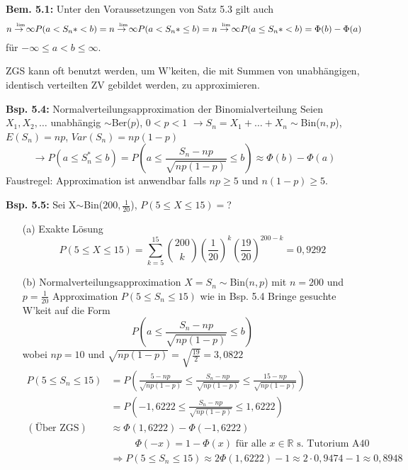 \documentclass[a4paper,11pt]{article}
\begin{document}
\vspace{6pt}
\noindent\textbf{Bem. 5.1:}
Unter den Voraussetzungen von Satz 5.3 gilt auch 
\[\overset{\mathclap{\scriptscriptstyle \text{lim}}}{n\rightarrow\infty} P(a<S_n*<b)=\overset{\mathclap{\scriptscriptstyle \text{lim}}}{n\rightarrow\infty}P(a<S_n*\leq b) = \overset{\mathclap{\scriptscriptstyle \text{lim}}}{n\rightarrow\infty}P(a\leq S_n*<b) = \Phi(b) - \Phi(a)\]
für $-\infty\leq a<b\leq\infty$.

\vspace{6pt}
\noindent ZGS kann oft benutzt werden, um W'keiten, die mit Summen von unabhängigen, identisch verteilten ZV gebildet werden, zu approximieren. 

\vspace{6pt}
\noindent\textbf{Bsp. 5.4:} Normalverteilungsapproximation der Binomialverteilung
Seien $X_1,X_2,\dots$ unabhängig $\sim$Ber($p$), $0<p<1$
$\rightarrow S_n = X_1 + \dots + X_n \sim$Bin($n,p$), $E(S_n)=np$, $Var(S_n)=np(1-p)$
\[\rightarrow P(a\leq S_n^*\leq b)  =P(a\leq \frac{S_n-np}{\sqrt{np(1-p)}}\leq b) \approx \Phi(b) - \Phi(a)\]
Faustregel: Approximation ist anwendbar falls $np\geq5$ und $n(1-p)\geq5$. 

\vspace{6pt}
\noindent\textbf{Bsp. 5.5:}
Sei X$\sim$Bin($200,\frac{1}{20}$), $P(5\leq X\leq15)=$?
\begin{itemize}
\item[(a)] Exakte Lösung 
\[P(5\leq X\leq15)=\sum_{k=5}^{15}\binom{200}{k}(\frac{1}{20})^k(\frac{19}{20})^{200-k} = 0,9292\]
\item[(b)] Normalverteilungsapproximation
$X=S_n\sim$Bin($n,p$) mit $n=200$ und $p=\frac{1}{20}$
\newline Approximation $P(5\leq S_n\leq15)$ wie in Bsp. 5.4
\newline Bringe gesuchte W'keit auf die Form 
\[P(a\leq \frac{S_n-np}{\sqrt{np(1-p)}}\leq b) \]
wobei $np=10$ und $\sqrt{np(1-p)}=\sqrt{\frac{19}{2}}=3,0822$
\begin{align*}
P(5\leq S_n\leq15) &= P(\frac{5-np}{\sqrt{np(1-p)}}\leq\frac{S_n-np}{\sqrt{np(1-p)}}\leq\frac{15-np}{\sqrt{np(1-p)}})\\
&= P(-1,6222\leq\frac{S_n-np}{\sqrt{np(1-p)}}\leq1,6222)\\
(\text{Über ZGS}) &\approx \Phi(1,6222)-\Phi(-1,6222)\\
& \hspace{30pt} \Phi(-x) = 1-\Phi(x) \text{ für alle } x\in\mathbb{R} \text{ s. Tutorium A40}\\
&\Rightarrow P(5\leq S_n\leq15) \approx 2\Phi(1,6222) - 1 \approx 2\cdot0,9474-1\approx 0,8948\\
\end{align*}
\end{itemize}
\end{document}
